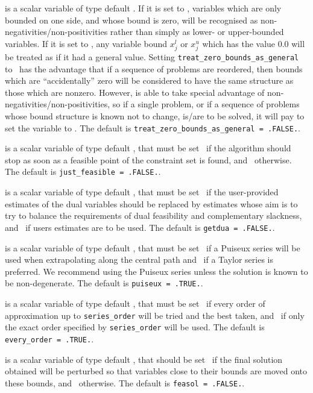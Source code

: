 \begin{description}
 is a scalar variable of type
default \logical.
If it is set to \false, variables which
are only bounded on one side, and whose bound is zero,
will be recognised as non-negativities/non-positivities rather than simply as
lower- or upper-bounded variables.
If it is set to \true, any variable bound
$x_{j}^{l}$ or $x_{j}^{u}$ which has the value 0.0 will be
treated as if it had a general value.
Setting {\tt treat\_zero\_bounds\_as\_general} to \true\ has the advantage
that if a sequence of problems are reordered, then bounds which are
``accidentally'' zero will be considered to have the same structure as
those which are nonzero. However, {\tt \fullpackagename} is
able to take special advantage of non-negativities/non-positivities, so
if a single problem, or if a sequence of problems whose
bound structure is known not to change, is/are to be solved,
it will pay to set the variable to \false.
The default is {\tt treat\_zero\_bounds\_as\_general = .FALSE.}.

 is a scalar variable of type default \logical, that
must be set \true\ if the algorithm should stop as soon as a feasible point
of the constraint set is found, and \false\ otherwise.
The default is {\tt just\_feasible = .FALSE.}.

 is a scalar variable of type default \logical, that
must be set \true\ if the user-provided estimates of the dual variables
should be replaced by estimates whose aim is to try to balance the
requirements of dual feasibility and complementary slackness,
and \false\ if users estimates are to be used.
The default is {\tt getdua = .FALSE.}.

 is a scalar variable of type default \logical, that
must be set \true\
if a Puiseux series will be used when extrapolating along the central path
and \false\ if a Taylor series is preferred.
We recommend using the Puiseux series unless the solution is known
to be non-degenerate.
The default is {\tt puiseux = .TRUE.}.

 is a scalar variable of type default \logical, that
must be set \true\
if every order of approximation up to {\tt series\_order} will be tried
and the best taken,
and \false\ if only the exact order specified by  {\tt series\_order}
will be used.
The default is {\tt every\_order = .TRUE.}.

 is a scalar variable of type default \logical, that
should be set \true\
if the final solution obtained will be perturbed
so that variables close to their bounds are moved onto these bounds,
and \false\ otherwise.
The default is {\tt feasol = .FALSE.}.


\end{description}
